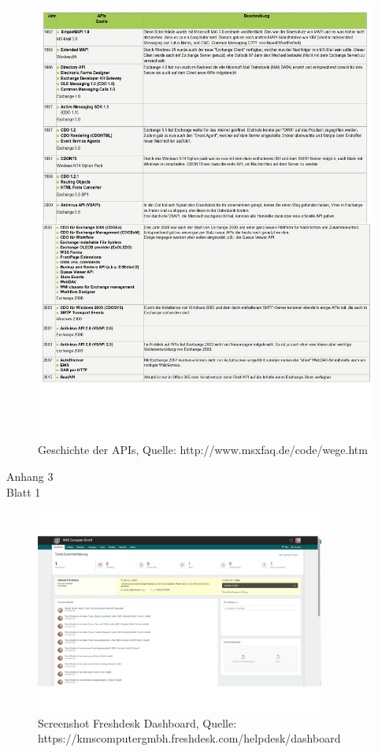\begin{figure}[h!]
\includegraphics[width=1.0\textwidth]{Abbildungen/API_Geschichte2.pdf}
\caption*{Geschichte der APIs, Quelle: http://www.msxfaq.de/code/wege.htm}
\label{API_Geschichte}
\end{figure}

\newpage

\begin{flushright}
Anhang 3\\
Blatt 1\\
\label{Anhang3_1}
\end{flushright}

\begin{figure}[h!]
\includegraphics[width=0.85\textwidth]{Abbildungen/Freshdesk.pdf}
\caption*{Screenshot Freshdesk Dashboard, \newline
Quelle: https://kmscomputergmbh.freshdesk.com/helpdesk/dashboard}
\label{Freshdesk}
\end{figure}



